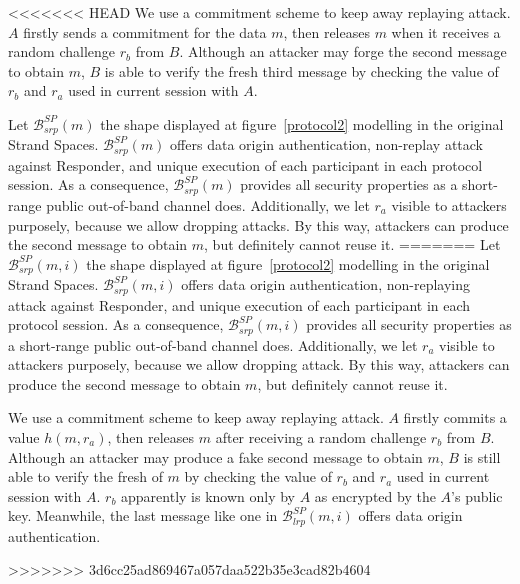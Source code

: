 <<<<<<< HEAD
We use a commitment scheme to keep away replaying attack. $A$ firstly sends a commitment for the data $m$, then releases $m$ when it receives a random challenge $r_b$ from $B$. Although an attacker may forge the second message to obtain $m$, $B$ is able to verify the fresh third message by checking the value of $r_b$ and $r_a$ used in current session with $A$. 

Let $\mathcal{B}^{SP}_{srp}(m)$ the shape displayed at figure~\ref{protocol2} modelling in the original Strand Spaces. $\mathcal{B}^{SP}_{srp}(m)$ offers data origin authentication, non-replay attack against Responder, and unique execution of each participant in each protocol session. As a consequence, $\mathcal{B}^{SP}_{srp}(m)$ provides all security properties as a short-range public out-of-band channel does. Additionally, we let $r_a$ visible to attackers purposely, because we allow dropping attacks. By this way, attackers can produce the second message to obtain $m$, but definitely cannot reuse it. 
=======
Let $\mathcal{B}^{SP}_{srp}(m,i)$ the shape displayed at figure~\ref{protocol2} modelling in the original Strand Spaces. $\mathcal{B}^{SP}_{srp}(m,i)$ offers data origin authentication, non-replaying attack against Responder, and unique execution of each participant in each protocol session. As a consequence, $\mathcal{B}^{SP}_{srp}(m,i)$ provides all security properties as a short-range public out-of-band channel does. Additionally, we let $r_a$ visible to attackers purposely, because we allow dropping attack. By this way, attackers can produce the second message to obtain $m$, but definitely cannot reuse it. 

We use a commitment scheme to keep away replaying attack. $A$ firstly commits a value $h(m,r_a)$, then releases $m$ after receiving a random challenge $r_b$ from $B$. Although an attacker may produce a fake second message to obtain $m$, $B$ is still able to verify the fresh of $m$ by checking the value of $r_b$ and $r_a$ used in current session with $A$. $r_b$ apparently is known only by $A$ as encrypted by the $A$'s public key. Meanwhile, the last message like one in $\mathcal{B}^{SP}_{lrp}(m,i)$ offers data origin authentication. 

>>>>>>> 3d6cc25ad869467a057daa522b35e3cad82b4604

